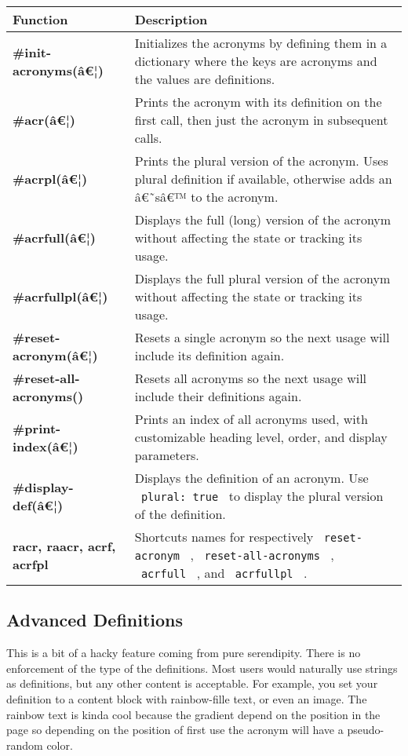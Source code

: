 \begin{longtable}[]{@{}ll@{}}
\toprule\noalign{}
\textbf{Function} & \textbf{Description} \\
\midrule\noalign{}
\endhead
\bottomrule\noalign{}
\endlastfoot
\textbf{\#init-acronyms(â€¦)} & Initializes the acronyms by defining
them in a dictionary where the keys are acronyms and the values are
definitions. \\
\textbf{\#acr(â€¦)} & Prints the acronym with its definition on the
first call, then just the acronym in subsequent calls. \\
\textbf{\#acrpl(â€¦)} & Prints the plural version of the acronym. Uses
plural definition if available, otherwise adds an â€˜sâ€™ to the
acronym. \\
\textbf{\#acrfull(â€¦)} & Displays the full (long) version of the
acronym without affecting the state or tracking its usage. \\
\textbf{\#acrfullpl(â€¦)} & Displays the full plural version of the
acronym without affecting the state or tracking its usage. \\
\textbf{\#reset-acronym(â€¦)} & Resets a single acronym so the next
usage will include its definition again. \\
\textbf{\#reset-all-acronyms()} & Resets all acronyms so the next usage
will include their definitions again. \\
\textbf{\#print-index(â€¦)} & Prints an index of all acronyms used, with
customizable heading level, order, and display parameters. \\
\textbf{\#display-def(â€¦)} & Displays the definition of an acronym. Use
\texttt{\ plural:\ true\ } to display the plural version of the
definition. \\
\textbf{racr, raacr, acrf, acrfpl} & Shortcuts names for respectively
\texttt{\ reset-acronym\ } , \texttt{\ reset-all-acronyms\ } ,
\texttt{\ acrfull\ } , and \texttt{\ acrfullpl\ } . \\
\end{longtable}

\subsection{Advanced Definitions}\label{advanced-definitions-1}

This is a bit of a hacky feature coming from pure serendipity. There is
no enforcement of the type of the definitions. Most users would
naturally use strings as definitions, but any other content is
acceptable. For example, you set your definition to a content block with
rainbow-fille text, or even an image. The rainbow text is kinda cool
because the gradient depend on the position in the page so depending on
the position of first use the acronym will have a pseudo-random color.


